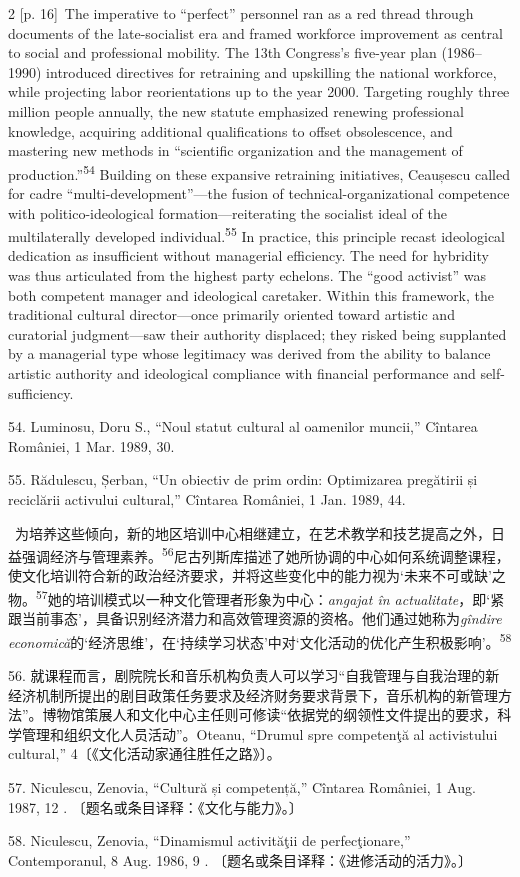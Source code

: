 \documentclass[10pt,a4paper]{article}
\begin{document}
\begin{paracol}{2}
{\scriptsize\color{gray} [p. 16]}\ The imperative to “perfect” personnel ran as a red thread through documents of the late-socialist era and framed workforce improvement as central to social and professional mobility. The 13th Congress’s five-year plan (1986–1990) introduced directives for retraining and upskilling the national workforce, while projecting labor reorientations up to the year 2000. Targeting roughly three million people annually, the new statute emphasized renewing professional knowledge, acquiring additional qualifications to offset obsolescence, and mastering new methods in “scientific organization and the management of production.”\nobreak\textsuperscript{54} Building on these expansive retraining initiatives, Ceaușescu called for cadre “multi-development”—the fusion of technical-organizational competence with politico-ideological formation—reiterating the socialist ideal of the multilaterally developed individual.\nobreak\textsuperscript{55} In practice, this principle recast ideological dedication as insufficient without managerial efficiency. The need for hybridity was thus articulated from the highest party echelons. The “good activist” was both competent manager and ideological caretaker. Within this framework, the traditional cultural director—once primarily oriented toward artistic and curatorial judgment—saw their authority displaced; they risked being supplanted by a managerial type whose legitimacy was derived from the ability to balance artistic authority and ideological compliance with financial performance and self-sufficiency.\par{\small 54. Luminosu, Doru S., “Noul statut cultural al oamenilor muncii,” Cîntarea României, 1 Mar. 1989, 30.\par}{\small 55. Rădulescu, Șerban, “Un obiectiv de prim ordin: Optimizarea pregătirii și reciclării activului cultural,” Cîntarea României, 1 Jan. 1989, 44.\par}
\switchcolumn*
{\scriptsize\color{gray} [p. 17]}\ 为培养这些倾向，新的地区培训中心相继建立，在艺术教学和技艺提高之外，日益强调经济与管理素\mbox{养。\textsuperscript{56}}尼古列斯库描述了她所协调的中心如何系统调整课程，使文化培训符合新的政治经济要求，并将这些变化中的能力视为‘未来不可或缺’之\mbox{物。\textsuperscript{57}}她的培训模式以一种文化管理者形象为中心：\textit{angajat în actualitate}，即‘紧跟当前事态’，具备识别经济潜力和高效管理资源的资格。他们通过她称为\textit{gîndire economică}的‘经济思维’，在‘持续学习状态’中对‘文化活动的优化产生积极影响’。\nobreak\textsuperscript{58}\par{\small 56. 就课程而言，剧院院长和音乐机构负责人可以学习“自我管理与自我治理的新经济机制所提出的剧目政策任务要求及经济财务要求背景下，音乐机构的新管理方法”。博物馆策展人和文化中心主任则可修读“依据党的纲领性文件提出的要求，科学管理和组织文化人员活动”。Oteanu, “Drumul spre competenţă al activistului cultural,” 4〔《文化活动家通往胜任之路》〕。\par}{\small 57. Niculescu, Zenovia, “Cultură și competență,” Cîntarea României, 1 Aug. 1987, 12 . 〔题名或条目译释：《文化与能力》。〕\par}{\small 58. Niculescu, Zenovia, “Dinamismul activităţii de perfecţionare,” Contemporanul, 8 Aug. 1986, 9 . 〔题名或条目译释：《进修活动的活力》。〕\par}

\end{paracol}
\end{document}
